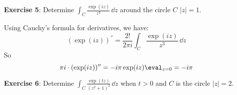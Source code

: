 \documentclass{article}
\begin{document}
\textbf{Exercise 5}: Determine $\int_{C}^{} \frac{\exp(iz)}{z^{3}} \, \dd{z} $ around the circle $C$ $\lvert z \rvert = 1$.
    \begin{answer}
        Using Cauchy's formula for derivatives, we have:
            \begin{equation*}
                (\exp(iz))^{''} = \dfrac{2!}{2\pi i} \int_{C}^{} \dfrac{\exp(iz)}{z^{3}} \, \dd{z} 
            \end{equation*}
        So 
            \begin{equation*}
                \pi i \cdot (\exp(iz))^{\prime\prime} = -i\pi\exp(iz)\eval_{z = 0} = -i\pi
            \end{equation*}
    \end{answer}

\textbf{Exercise 6}: Determine $\int_{C}^{}  \frac{\exp(tz)}{(z^{2} + 1)^{2}} \, \dd{z} $ when $t > 0$ and $C$ is the circle $\lvert z \rvert = 2$.
\end{document}
